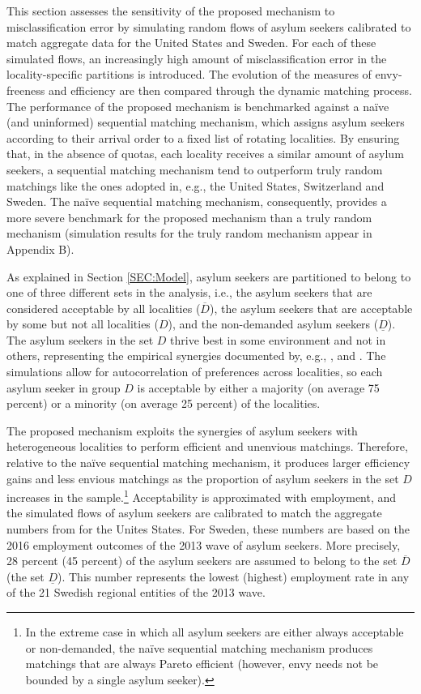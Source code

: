 \documentclass[12pt,fleqn]{article}
\begin{document}
This section assesses the sensitivity of the proposed mechanism to misclassification error by simulating random flows of asylum seekers calibrated to match aggregate data for the United States and Sweden. For each of these simulated flows, an increasingly high amount of misclassification error in the locality-specific partitions is introduced. The evolution of the measures of envy-freeness and efficiency are then compared through the dynamic matching process. The performance of the proposed mechanism is benchmarked against a na\"{i}ve (and uninformed) sequential matching mechanism, which assigns asylum seekers according to their arrival order to a fixed list of rotating localities. By ensuring that, in the absence of quotas, each locality receives a similar amount of asylum seekers, a sequential matching mechanism tend to outperform truly random matchings like the ones adopted in, e.g., the United States, Switzerland and Sweden. The na\"{i}ve sequential matching mechanism, consequently, provides a more severe benchmark for the proposed mechanism than a truly random mechanism (simulation results for the truly random mechanism appear in Appendix B).

As explained in Section \ref{SEC:Model}, asylum seekers are partitioned to belong to one of three different sets in the analysis, i.e., the asylum seekers that are considered acceptable by all localities ($\overline{D}$), the asylum seekers that are acceptable by some but not all localities ($D$), and the non-demanded asylum seekers ($\underline{D}$). The asylum seekers in the set $D$ thrive best in some environment and not in others, representing the empirical synergies documented by, e.g., \cite{bib:BansakEtAl}, \citet{bib:Damm} and \citet{bib:EdinEtAl}. The simulations allow for autocorrelation of preferences across localities, so each asylum seeker in group $D$ is acceptable by either a majority (on average 75 percent) or a minority (on average 25 percent) of the localities.

The proposed mechanism exploits the synergies of asylum seekers with heterogeneous localities to perform efficient and unenvious matchings. Therefore, relative to the na\"{i}ve sequential matching mechanism, it produces larger efficiency gains and less envious matchings as the proportion of asylum seekers in the set $D$ increases in the sample.\footnote{In the extreme case in which all asylum seekers are either always acceptable or non-demanded, the na\"{i}ve sequential matching mechanism produces matchings that are always Pareto efficient (however, envy needs not be bounded by a single asylum seeker).} Acceptability is approximated with employment, and the simulated flows of asylum seekers are calibrated to match the aggregate numbers from \cite{bib:BansakEtAl} for the Unites States. For Sweden, these numbers are based on the 2016 employment outcomes of the 2013 wave of asylum seekers. More precisely, 28 percent (45 percent) of the asylum seekers are assumed to belong to the set $\overline{D}$ (the set $\underline{D}$). This number represents the lowest (highest) employment rate in any of the 21 Swedish regional entities of the 2013 wave.
\end{document}
